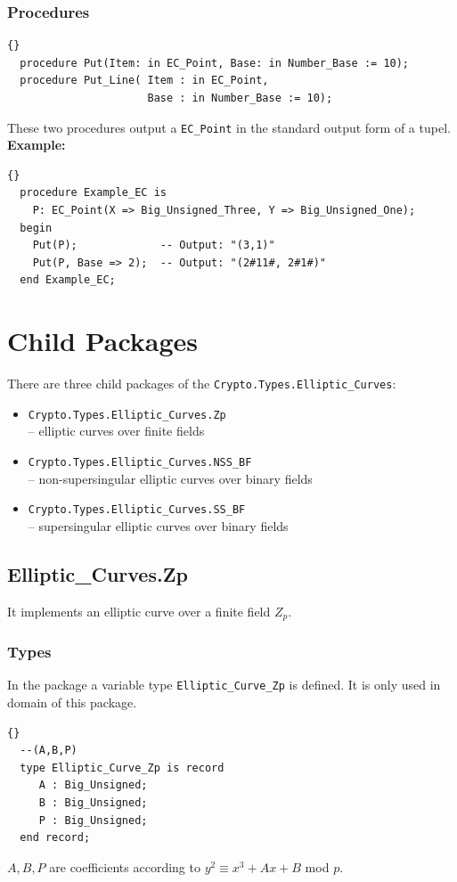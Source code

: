 
\subsubsection*{Procedures}
\begin{lstlisting}{}
  procedure Put(Item: in EC_Point, Base: in Number_Base := 10);
  procedure Put_Line( Item : in EC_Point, 
                      Base : in Number_Base := 10);
\end{lstlisting}
These two procedures output a \texttt{EC\_Point} in the standard output form of a tupel.\\

\noindent\textbf{Example:}
\begin{lstlisting}{}
  procedure Example_EC is
    P: EC_Point(X => Big_Unsigned_Three, Y => Big_Unsigned_One);
  begin
    Put(P);             -- Output: "(3,1)"
    Put(P, Base => 2);  -- Output: "(2#11#, 2#1#)"
  end Example_EC;
\end{lstlisting}


\section{Child Packages}
There are three child packages of the \texttt{Crypto.Types.Elliptic\_Curves}:
\begin{itemize}
\item \texttt{Crypto.Types.Elliptic\_Curves.Zp} \\
      -- elliptic curves over finite fields
\item \texttt{Crypto.Types.Elliptic\_Curves.NSS\_BF}\\
      -- non-supersingular elliptic curves over binary fields
\item \texttt{Crypto.Types.Elliptic\_Curves.SS\_BF}\\
      -- supersingular elliptic curves over binary fields
\end{itemize}
\subsection{Elliptic\_Curves.Zp}\label{ZP}
It implements an elliptic curve over a finite field $Z_p$.
\subsubsection*{Types}
In the package a variable type \texttt{Elliptic\_Curve\_Zp} is defined. It is only used in domain of this package.
\begin{lstlisting}{}
  --(A,B,P)
  type Elliptic_Curve_Zp is record
	 A : Big_Unsigned;
	 B : Big_Unsigned;
	 P : Big_Unsigned;
  end record;
\end{lstlisting}
$A,B,P$ are coefficients according to $y^2 \equiv x^3 + Ax + B$ mod $p$.
